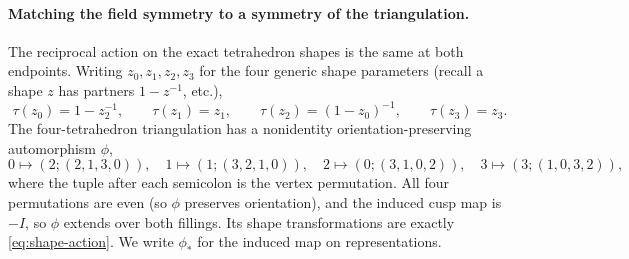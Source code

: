\documentclass[11pt]{article}
\theoremstyle{definition}
\begin{document}
\paragraph{Matching the field symmetry to a symmetry of the triangulation.}
The reciprocal action on the exact tetrahedron shapes is the same at both
endpoints.  Writing $z_0,z_1,z_2,z_3$ for the four generic shape parameters
(recall a shape $z$ has partners $1-z^{-1}$, etc.),
\begin{equation}\label{eq:shape-action}
 \tau(z_0)=1-z_2^{-1},\qquad
 \tau(z_1)=z_1,\qquad
 \tau(z_2)=(1-z_0)^{-1},\qquad
 \tau(z_3)=z_3.
\end{equation}
The four-tetrahedron triangulation has a nonidentity orientation-preserving
automorphism $\phi$,
\begin{equation}\label{eq:tet-auto}
 0\mapsto(2;(2,1,3,0)),\quad
 1\mapsto(1;(3,2,1,0)),\quad
 2\mapsto(0;(3,1,0,2)),\quad
 3\mapsto(3;(1,0,3,2)),
\end{equation}
where the tuple after each semicolon is the vertex permutation.  All four
permutations are even (so $\phi$ preserves orientation), and the induced cusp map
is $-I$, so $\phi$ extends over both fillings.  Its shape transformations are
exactly \eqref{eq:shape-action}.  We write $\phi_*$ for the induced map on
representations.
\end{document}
